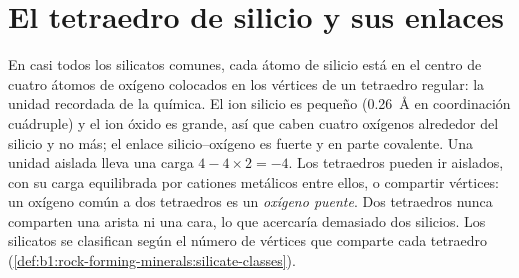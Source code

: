 \section{El tetraedro de silicio y sus enlaces}

En casi todos los silicatos comunes, cada átomo de silicio está en el centro de cuatro átomos de oxígeno
colocados en los vértices de un tetraedro regular: la unidad  recordada de la química. El ion
silicio es pequeño (\qty{0.26}{\angstrom} en coordinación cuádruple) y el ion óxido es grande, así que
caben cuatro oxígenos alrededor del silicio y no más; el enlace silicio--oxígeno es fuerte y en parte
covalente. Una unidad aislada lleva una carga $4 - 4\times2 = -4$.
Los tetraedros pueden ir aislados, con su carga equilibrada por cationes metálicos entre ellos, o compartir
vértices: un oxígeno común a dos tetraedros es un \emph{oxígeno puente}. Dos tetraedros nunca comparten una
arista ni una cara, lo que acercaría demasiado dos silicios. Los silicatos se clasifican según el número de
vértices que comparte cada tetraedro (\cref{def:b1:rock-forming-minerals:silicate-classes}).

